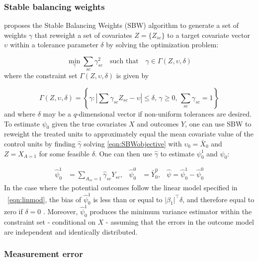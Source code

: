 \documentclass[aoas]{imsart}
\theoremstyle{plain}
\theoremstyle{remark}
\begin{document}
\subsubsection{Stable balancing weights}\label{ssec:SBW}

\citet{zubizarreta2015stable} proposes the Stable Balancing Weights (SBW) algorithm to generate a set of weights $\gamma$ that reweight a set of covariates $Z = \{Z_{sc}\}$ to a target covariate vector $\upsilon$ within a tolerance parameter $\delta$ by solving the optimization problem:

\begin{equation}\label{eqn:SBWobjective}
 \min_{\gamma} \sum_{sc} \gamma_{sc}^2 \quad \text{such that} \quad \gamma \in \Gamma(Z, \upsilon, \delta)
\end{equation}
%
where the constraint set $\Gamma(Z, \upsilon, \delta)$ is given by

\[ \Gamma(Z, \upsilon, \delta) = \left\{\gamma: \left|\sum \gamma_{sc} Z_{sc}  - \upsilon\right| \leq \delta,\, \gamma \geq 0,\, \sum_{sc} \gamma_{sc} = 1\right\}\]
%
and where $\delta$ may be a $q$-dimensional vector if non-uniform tolerances are desired. To estimate $\psi_0$ given the true covariates $X$ and outcomes $Y$, one can use SBW to reweight the treated units to approximately equal the mean covariate value of the control units by finding $\hat{\gamma}$ solving \eqref{eqn:SBWobjective} with $\upsilon_0 = \bar{X}_0$ and $Z = X_{A=1}$ for some feasible $\delta$. One can then use $\hat{\gamma}$ to estimate $\psi_0^1$ and $\psi_0$:

\begin{align}\label{eqn:estimators}
\hat{\psi}_0^1 &= \sum_{A_{sc}=1} \hat{\gamma}_{sc} Y_{sc}, & \hat{\psi}_0^0 & = \bar{Y}_0^0, & \hat{\psi} = \hat{\psi}_0^1 - \hat{\psi}_0^0
\end{align}
%
In the case where the potential outcomes follow the linear model specified in ~\eqref{eqn:linmod}, the bias of $\hat{\psi}^1_0$ is less than or equal to $\lvert\beta_1\rvert^\top\delta$, and therefore equal to zero if $\delta = 0$ \citep{zubizarreta2015stable}. Moreover, $\hat{\psi}_0^1$ produces the minimum variance estimator within the constraint set - conditional on $X$ - assuming that the errors in the outcome model are independent and identically distributed.

\subsubsection{Measurement error}\label{ssec:methodsmsrment} 
\end{document}
